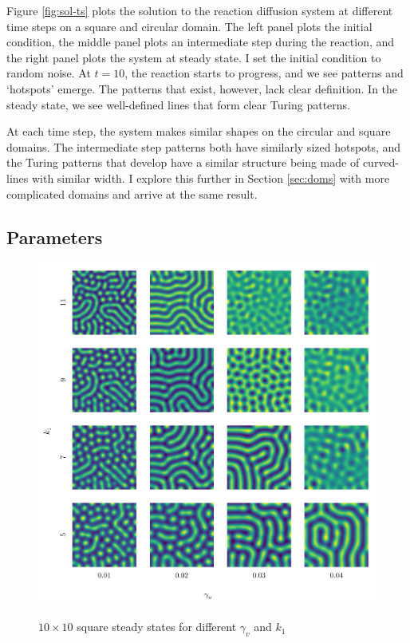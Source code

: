 Figure \ref{fig:sol-ts} plots the solution to the reaction diffusion system at different time steps on a square and circular domain. The left panel plots the initial condition, the middle panel plots an intermediate step during the reaction, and the right panel plots the system at steady state. I set the initial condition to random noise. At $t = 10$, the reaction starts to progress, and we see patterns and `hotspots' emerge. The patterns that exist, however, lack clear definition. In the steady state, we see well-defined lines that form clear Turing patterns.

At each time step, the system makes similar shapes on the circular and square domains. The intermediate step patterns both have similarly sized hotspots, and the Turing patterns that develop have a similar structure being made of curved-lines with similar width. I explore this further in Section \ref{sec:doms} with more complicated domains and arrive at the same result.


\subsection{Parameters}

\begin{figure}[t!]
    \centering
    \caption{$10 \times 10$ square steady states for different $\gamma_v$ and $k_1$}
    \includegraphics{figures/square_params.pdf}
    \label{fig:sq-pars}
\end{figure}

